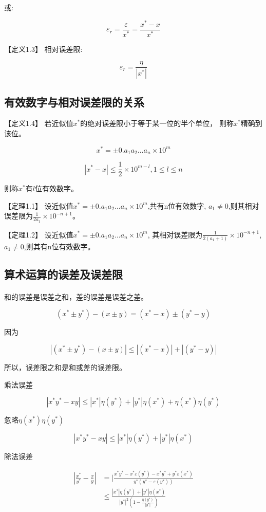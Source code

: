 \documentclass[12pt]{report}
\begin{document}
或:

\[ \varepsilon_r = \frac{\varepsilon}{x^*} = \frac{x^* - x}{x^*} \]

【定义1.3】 \quad 相对误差限:

\[ \varepsilon_r = \frac{\eta}{|x^*|} \]

\subsection{有效数字与相对误差限的关系}

【定义1.4】 \quad 若近似值$x^*$的绝对误差限小于等于某一位的半个单位，
则称$x^*$精确到该位。

\[ x^* = \pm 0.a_1 a_2 \ldots a_n \times 10^m \]

\[ |x^* - x| \leq \frac{1}{2} \times 10^{m-l}, 1\leq l \leq n \]

则称$x^*$有$l$位有效数字。

【定理1.1】 \quad 设近似值\( x^* = \pm 0.a_1 a_2 \ldots a_n \times 10^m \),共有n位有效数字,
\( a_1 \neq 0 \),则其相对误差限为\( \frac{1}{2a_1} \times 10^{-n+1} \)。

【定理1.2】 \quad 设近似值\( x^* = \pm 0.a_1 a_2 \ldots a_n \times 10^m \),
其相对误差限为\( \frac{1}{2(a_1 + 1)} \times 10^{-n+1} \),\( a_1 \neq 0 \),则其有n位有效数字。

\subsection{算术运算的误差及误差限}

\paragraph{ } 和的误差是误差之和，差的误差是误差之差。

\[ (x^* \pm y^*) - (x \pm y) = (x^* - x) \pm (y^* - y) \]

因为

\[ |(x^* \pm y^*) - (x \pm y)| \leq |(x^* - x)| + |(y^* - y)| \]

所以，误差限之和是和或差的误差限。

乘法误差

\[ |x^* y^* -xy| \leq |x^*| \eta (y^*) + |y^*| \eta (x^*) + \eta(x^*) \eta(y^*) \]

忽略$\eta(x^*) \eta(y^*)$

\[ |x^* y^* -xy| \leq |x^*| \eta (y^*) + |y^*| \eta (x^*) \]

除法误差

\begin{align*}
	|\frac{x^*}{y^*} - \frac{x}{y}| & = |\frac{x^* y^* - x^* \varepsilon (y^*) - x^* y^* + y^* \varepsilon (x^*)}{y^* \left(y^* - \varepsilon(y^*)\right)} \\
	                                & \leq \frac{|x^*|\eta (y^*) + |y^*|\eta(x^*)}
	{|y^*|^2 \left(1 - \frac{\eta(y^*)}{|y^*|}\right)}
\end{align*}
\end{document}
